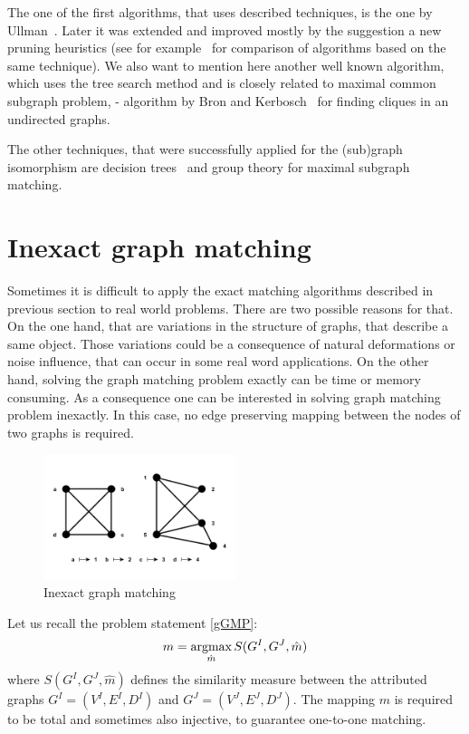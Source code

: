 The one of the first algorithms, that uses described techniques, is the one by Ullman~\cite{Ullmann}. Later it was extended and improved mostly by the suggestion a new pruning heuristics (see for example~\cite{Lee2013} for comparison of algorithms based on the same technique). We also want to mention here another well known algorithm, which uses the tree search method and is closely related to maximal common subgraph problem, - algorithm by Bron and Kerbosch~\cite{BronKerbosch} for finding cliques in an undirected graphs.

The other techniques, that were successfully applied for the (sub)graph isomorphism are decision trees~\cite{Messmer1999,Shearer1998,Shearer2001} and group theory\cite{McKay} for maximal subgraph matching. 

\section{Inexact graph matching}

Sometimes it is difficult to apply the exact matching algorithms described in previous section to real world problems. There are two possible reasons for that. On the one hand, that are variations in the structure of graphs, that describe a same object. Those variations could be a consequence of natural deformations or noise influence, that can occur in some real word applications. On the other hand, solving the graph matching problem exactly can be time or memory consuming. As a consequence one can be interested in solving graph matching problem inexactly. In this case, no edge preserving mapping between the nodes of two graphs is required.

\begin{figure}[h!]
	\centering
	\includegraphics[width=0.5\textwidth]{chapter1/fig/inexactGM}
    \caption{Inexact graph matching}
    \label{fig:inexact_GM}
\end{figure}
    

Let us recall the problem statement \eqref{gGMP}: 
\begin{equation*}
m = \mathop{\rm argmax}_{\hat{m}}S(G^I, G^J, \hat{m})
\end{equation*}
where $S(G^I, G^J, \hat{m})$ defines the similarity measure between the attributed graphs $G^I = (V^I, E^I,D^I)$ and $G^J = (V^J, E^J,D^J)$. The mapping $m$ is required to be total and sometimes also injective, to guarantee one-to-one matching.

